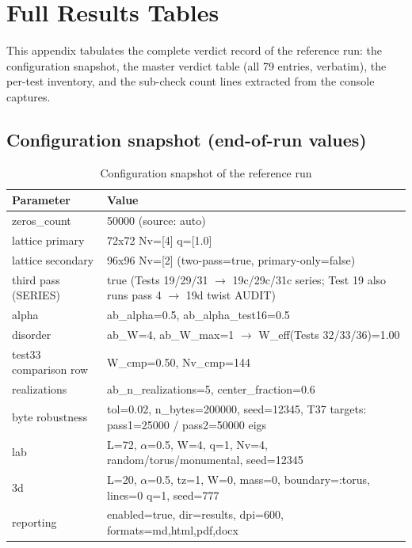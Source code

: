\documentclass[10pt]{article}
\begin{document}
\appendix

\section{Full Results Tables}

This appendix tabulates the complete verdict record of the reference run: the configuration snapshot, the master verdict table (all 79 entries, verbatim), the per-test inventory, and the sub-check count lines extracted from the console captures.

\subsection{Configuration snapshot (end-of-run values)}

\begin{table}[htbp]
\centering
\small
\caption{Configuration snapshot of the reference run}
\begin{tabular}{ll}
\toprule
\textbf{Parameter} & \textbf{Value} \\
\midrule
zeros\_count & 50000  (source: auto) \\
lattice primary & 72x72  Nv=[4]  q=[1.0] \\
lattice secondary & 96x96  Nv=[2]  (two-pass=true, primary-only=false) \\
third pass (SERIES) & true  (Tests 19/29/31 $\rightarrow$ 19c/29c/31c series; Test 19 also runs pass 4 $\rightarrow$ 19d twist AUDIT) \\
alpha & ab\_alpha=0.5, ab\_alpha\_test16=0.5 \\
disorder & ab\_W=4, ab\_W\_max=1  $\rightarrow$ W\_eff(Tests 32/33/36)=1.00 \\
test33 comparison row & W\_cmp=0.50, Nv\_cmp=144 \\
realizations & ab\_n\_realizations=5, center\_fraction=0.6 \\
byte robustness & tol=0.02, n\_bytes=200000, seed=12345, T37 targets: pass1=25000 / pass2=50000 eigs \\
lab & L=72, $\alpha$=0.5, W=4, q=1, Nv=4, random/torus/monumental, seed=12345 \\
3d & L=20, $\alpha$=0.5, tz=1, W=0, mass=0, boundary=:torus, lines=0 q=1, seed=777 \\
reporting & enabled=true, dir=results, dpi=600, formats=md,html,pdf,docx \\
\bottomrule
\end{tabular}
\end{table}
\end{document}
